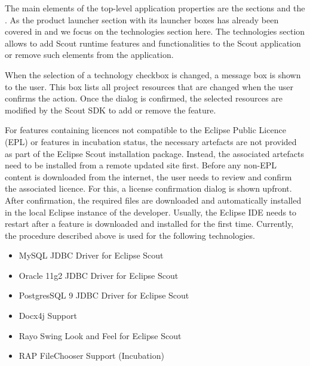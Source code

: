 \documentclass[a4paper,10pt,twoside]{book}
\begin{document}
The main elements of the top-level application properties are the sections  and the . 
As the product launcher section with its launcher boxes has already been covered in  and  we focus on the technologies section here.
The technologies section allows to add Scout runtime features and functionalities to the Scout application or remove such elements from the application. 

When the selection of a technology checkbox is changed, a message box is shown to the user. 
This box lists all project resources that are changed when the user confirms the action. 
Once the dialog is confirmed, the selected resources are modified by the Scout SDK to add or remove the feature. 

For features containing licences not compatible to the Eclipse Public Licence (EPL) or features in incubation status, the necessary artefacts are not provided as part of the Eclipse Scout installation package. 
Instead, the associated artefacts need to be installed from a remote updated site first. 
Before any non-EPL content is downloaded from the internet, the user needs to review and confirm the associated licence. 
For this, a license confirmation dialog is shown upfront. 
After confirmation, the required files are downloaded and automatically installed in the local Eclipse instance of the developer. 
Usually, the Eclipse IDE needs to restart after a feature is downloaded and installed for the first time. 
Currently, the procedure described above is used for the following technologies. 

\begin{itemize}
  \item MySQL JDBC Driver for Eclipse Scout
  \item Oracle 11g2 JDBC Driver for Eclipse Scout
  \item PostgresSQL 9 JDBC Driver for Eclipse Scout
  \item Docx4j Support
  \item Rayo Swing Look and Feel for Eclipse Scout
  \item RAP FileChooser Support (Incubation)
\end{itemize}
\end{document}
